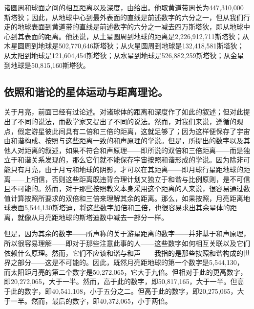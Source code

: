 诸圆周和球面之间的相互距离以及深度，由给出。他取黄道带周长为447,310,000斯塔狄；因此，从地球中心到最外表面的直线是前述数字的六分之一，但从我们行走的地球表面到黄道带的直线是前述数字的六分之一减去四万斯塔狄，即从地球中心到其表面的距离。他还说，从土星圆周到地球的距离是2,226,912,711斯塔狄；从木星圆周到地球是502,770,646斯塔狄；从火星圆周到地球是132,418,581斯塔狄；从太阳到地球是121,604,454斯塔狄；从水星到地球是526,882,259斯塔狄；从金星到地球是50,815,160斯塔狄。\par


\subsection{依照和谐论的星体运动与距离理论。}

关于月亮，前面已经有过论述。对诸球体的距离和深度作了如此的叙述；但对此提出了不同的说法，而数学家又提出了不同的说法。然而，对我们来说，遵循的观点，假定游星彼此间具有二倍和三倍的距离，这就足够了；因为这样便保存了宇宙由和谐构成、按照与这些距离一致的和声原理的学说。但是，所提出的数字以及其他人对距离的叙述，如果不符合和声原理——即所说的双倍和三倍距离——而是独立于和谐关系发现的，那么它们就不能保存宇宙按照和谐形成的学说。因为除非可能只有月亮，由于月亏和地球的阴影，才可以在其距离——即月球行星距地球的距离——上相信，否则这些距离既违背合理计划又独立于和谐与比例原则，是不可信且不可能的。然而，对于那些按照教义本身采用这个距离的人来说，很容易通过数值计算按照所要求的双倍和三倍来理解其余的距离。那么，如果按照，月亮距离地球表面5,544,130斯塔迪，将这些数字加倍和三倍，也很容易求出其余星体的距离，就像从月亮距地球的斯塔迪数中减去一部分一样。\par

但是，因为其余的数字——所声称的关于游星距离的数字——并非基于和声原理，所以很容易理解——即对于那些注意此事的人——这些数字如何相互关联以及它们依赖什么原理。然而，它们不应该和谐与和声——我指的是那些按照和谐构成的世界之部分——这是不可能的。因此，既然月亮距地球的第一个数字是5,544,130，而太阳距月亮的第二个数字是50,272,065，它大于九倍。但相对于此的更高数字，即20,272,065，大于一半。然而，高于此的数字，即50,817,165，大于一半。但高于此的数字，即40,541,108，小于五分之二。但高于此的数字，即20,275,065，大于一半。然而，最后的数字，即40,372,065，小于两倍。\par

